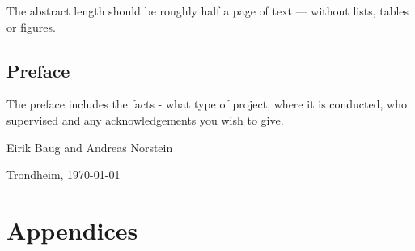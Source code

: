 \documentclass[a4paper]{book}
\newcommand{\thesisAuthor}{Eirik Baug and Andreas Norstein}
\begin{document}
The abstract length should be roughly half a page of text --- without lists, tables or figures.  

\clearpage

\section*{Preface}



\vspace{1cm}

The preface includes the facts - what type of project, where it is conducted, who supervised and any acknowledgements you wish to give. 

\vfill

\hfill \thesisAuthor

\hfill Trondheim, \today

\clearpage

\tableofcontents

\listoffigures

\listoftables


\mainmatter







\backmatter



\chapter{Appendices}
\label{cha:appendices}
\end{document}
